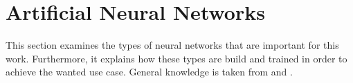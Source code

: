 \section{Artificial Neural Networks}
\label{sec:neural-networks}
This section examines the types of neural networks that are important for this work.
Furthermore, it explains how these types are build and trained in order to achieve the wanted use case.
General knowledge is taken from \cite{Goodfellow-et-al-2016} and \cite{cs231n}.






